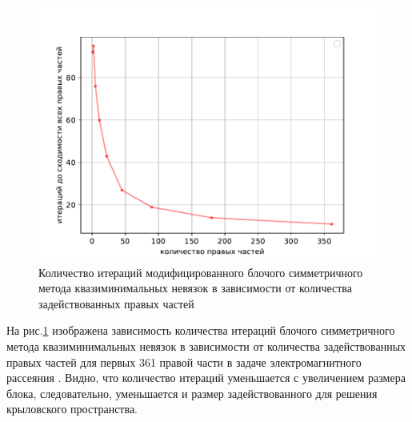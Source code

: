 \begin{figure}[H]
    \centering
    \includegraphics[width=0.7\linewidth]{images/mvss.pdf}
    \caption{Количество итераций модифицированного блочого симметричного метода квазиминимальных невязок в зависимости от количества задействованных правых частей}
    \label{fig:mvss}
\end{figure}

\par На рис.\ref{fig:mvss} изображена зависимость количества итераций блочого 
симметричного метода квазиминимальных невязок в зависимости от количества задействованных
 правых частей для первых 361 правой части в задаче электромагнитного рассеяния \cite{stavtsev2009application}.
Видно, что количество итераций уменьшается с увеличением размера блока, следовательно, уменьшается
и размер задействованного для решения крыловского пространства.   

\newpage
